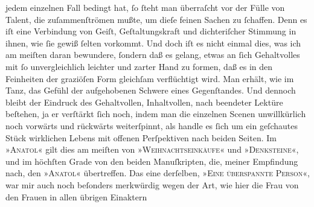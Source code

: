               jedem einzelnen Fall bedingt hat,{ }ſo{ }ſteht man überraſcht vor der Fülle von Talent,
               die zuſammenſtrömen mußte, um dieſe feinen Sachen zu{ }ſchaffen. Denn es iſt eine
               Verbindung von Geiſt, Geſtaltungskraft und dichteriſcher Stimmung in ihnen, wie{ }ſie
               gewiß{ }ſelten vorkommt. Und doch iſt es nicht einmal dies, was ich am meiſten {\pb}daran bewundere,{ }ſondern daß es gelang,
               etwas an{ }ſich Gehaltvolles mit{ }ſo unvergleichlich leichter und zarter Hand zu formen,
               daß es in den Feinheiten der graziöſen Form gleichſam verflüchtigt wird. Man erhält,
               wie im Tanz, das Gefühl der aufgehobenen Schwere eines Gegenſtandes. Und dennoch
               bleibt der Eindruck des Gehaltvollen, Inhaltvollen, nach beendeter Lektüre beſtehen,
               ja er verſtärkt{ }ſich noch, indem man die einzelnen Scenen unwillkürlich noch vorwärts
               und rückwärts weiterſpinnt, als handle es{ }ſich um ein geſchautes Stück wirklichen
               Lebens mit offenen Perſpektiven nach beiden Seiten. Im »\textsc{Anatol}« gilt dies am meiſten von »\textsc{Weihnachtseinkäufe}« und »\textsc{Denksteine}«, und im höchſten Grade von den beiden Manuſkripten, die, meiner Empfindung
               nach, den »\textsc{Anatol}« übertreffen. Das eine derſelben, »\textsc{Eine überspannte Person}«, war mir auch noch beſonders merkwürdig wegen der Art, wie hier die Frau von
               den Frauen {\pb}in allen übrigen Einaktern
